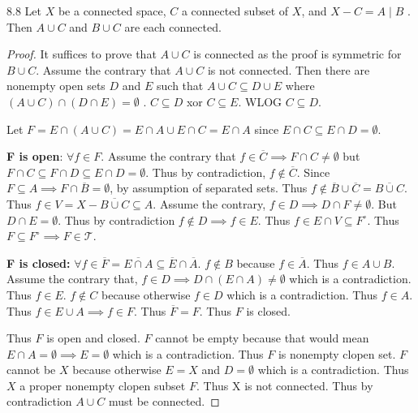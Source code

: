 \documentclass{article}
\newcommand*{\T}{\mathcal{T}}
\newcommand*{\subeq}{\subseteq}
\newcommand*{\empset}{\emptyset}
\begin{document}
\begin{claim}{8.8}\label{Claim 8.8.}
    Let $X$ be a connected space, $C$ a connected subset of $X$, and $X - C = A \mid B$ . Then $A \cup C$ and $B \cup C$ are each connected.
\end{claim}
\begin{proof}
    It suffices to prove that $A \cup C$ is connected as the proof is symmetric for $B \cup C$. 
    Assume the contrary that $A \cup C$ is not connected. Then there are nonempty open sets $D$ and $E$ such that $A \cup C \subeq D \cup E$ where $(A \cup C) \cap (D \cap E) = \empset$ . $C \subeq D$ xor $C \subeq E$. WLOG $C \subeq D$.
    
    Let $F = E \cap (A \cup C) = E \cap A \cup E \cap C = E \cap A$ since $E \cap C \subeq E \cap D = \empset$. 
    
    \textbf{F is open}: $\forall f \in F$. Assume the contrary that $f \in \overline{C} \implies F \cap C \neq \empset$ but $F \cap C \subeq F \cap D \subeq E \cap D = \empset$. Thus by contradiction, $f \not \in \overline{C}$. Since $F \subeq A \implies F \cap \overline{B} = \empset$, by assumption of separated sets. Thus $f \not \in \overline{B} \cup \overline{C} = \overline{B \cup C}$. Thus $f \in V = X - \overline{B \cup C} \subeq A$. Assume the contrary, $f \in D \implies D \cap F \neq \empset$. But $D \cap E = \empset$. Thus by contradiction $f \not \in D \implies f \in E$. Thus $f \in E \cap V \subeq F^\circ$. Thus $F \subeq F^\circ \implies F \in \T$. 
    
    \textbf{F is closed:} $\forall f \in \overline{F} = \overline{E \cap A} \subeq \overline{E} \cap \overline{A}$. $f \not \in B$ because $f \in \overline{A}$. Thus $f \in A \cup B$. Assume the contrary that, $f \in D \implies D \cap (E \cap A) \neq \empset$ which is a contradiction. Thus $f \in E$. $f \not \in C$ because otherwise $f\in D$ which is a contradiction. Thus $f \in A$. Thus $f \in E \cup A \implies f \in F$. Thus $\overline{F} = F$. Thus $F$ is closed. 
    
    Thus $F$ is open and closed. $F$ cannot be empty because that would mean $E \cap A = \empset \implies E = \empset$ which is a contradiction. Thus $F$ is nonempty clopen set. $F$ cannot be $X$ because otherwise $E = X$ and $D = \empset$ which is a contradiction. Thus $X$ a proper nonempty clopen subset $F$. Thus X is not connected. Thus by contradiction $A \cup C$ must be connected.    

\end{proof}
\end{document}
